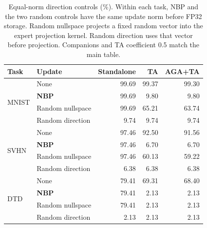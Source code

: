 \begin{table}[!t]
\centering
\small
\setlength{\tabcolsep}{4pt}
\caption{Equal-norm direction controls (\%). Within each task, NBP and the two random controls have the same update norm before FP32 storage. Random nullspace projects a fixed random vector into the expert projection kernel. Random direction uses that vector before projection. Companions and TA coefficient 0.5 match the main table.}
\label{tab:ablation}
\begin{tabular}{llrrr}
\toprule
Task & Update & Standalone & TA & AGA+TA \\
\midrule
\multirow{4}{*}{MNIST} & None & 99.69 & 99.37 & 99.30 \\
 & \textbf{NBP} & 99.69 & 9.80 & 9.80 \\
 & Random nullspace & 99.69 & 65.21 & 63.74 \\
 & Random direction & 9.74 & 9.74 & 9.74 \\
\midrule
\multirow{4}{*}{SVHN} & None & 97.46 & 92.50 & 91.56 \\
 & \textbf{NBP} & 97.46 & 6.70 & 6.70 \\
 & Random nullspace & 97.46 & 60.13 & 59.22 \\
 & Random direction & 6.38 & 6.38 & 6.38 \\
\midrule
\multirow{4}{*}{DTD} & None & 79.41 & 69.31 & 68.40 \\
 & \textbf{NBP} & 79.41 & 2.13 & 2.13 \\
 & Random nullspace & 79.41 & 2.13 & 2.13 \\
 & Random direction & 2.13 & 2.13 & 2.13 \\
\bottomrule
\end{tabular}
\end{table}
